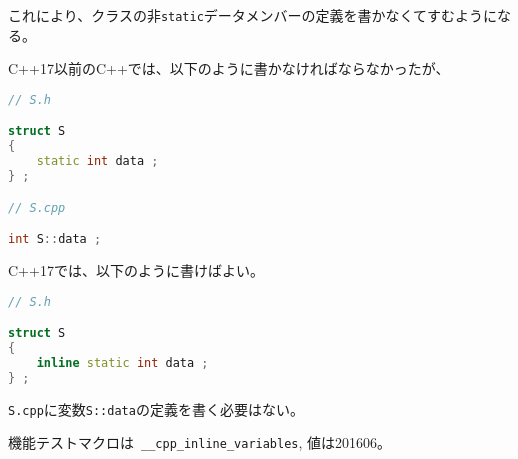 これにより、クラスの非\lstinline!static!データメンバーの定義を書かなくてすむようになる。

C++17以前のC++では、以下のように書かなければならなかったが、
\begin{lstlisting}[language=C++]
// S.h

struct S
{
    static int data ;
} ;

// S.cpp

int S::data ;
\end{lstlisting}
C++17では、以下のように書けばよい。
\begin{lstlisting}[language=C++]
// S.h

struct S
{
    inline static int data ;
} ;
\end{lstlisting}

\lstinline!S.cpp!に変数\lstinline!S::data!の定義を書く必要はない。

機能テストマクロは~\lstinline!__cpp_inline_variables!, 値は201606。

